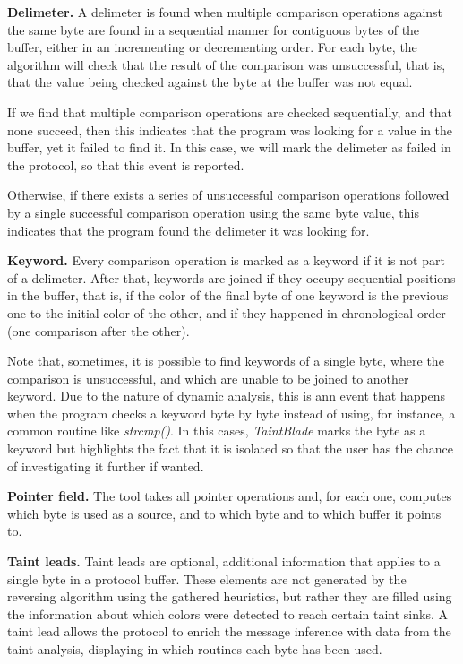 \documentclass[conference]{IEEEtran}
\begin{document}
\textbf{Delimeter.} A delimeter is found when multiple comparison operations against the same byte
are found in a sequential manner for contiguous bytes of the buffer, either in an incrementing
or decrementing order. For each byte, the algorithm will check that the result of the comparison
was unsuccessful, that is, that the value being checked against the byte at the buffer was not equal.

If we find that multiple comparison operations are checked sequentially, and
that none succeed, then this indicates that the program was looking for a value
in the buffer, yet it failed to find it. In this case, we will mark the
delimeter as failed in the protocol, so that this event is reported.

Otherwise, if there exists a series of unsuccessful comparison operations
followed by a single successful comparison operation using the same byte value,
this indicates that the program found the delimeter it was looking for.

\textbf{Keyword.} Every comparison operation is marked as a keyword if it is not part of a delimeter. After that,
keywords are joined if they occupy sequential positions in the buffer, that is, if the color of the final byte of
one keyword is the previous one to the initial color of the other, and if they happened in chronological order
(one comparison after the other).

Note that, sometimes, it is possible to find keywords of a single byte, where
the comparison is unsuccessful, and which are unable to be joined to another
keyword. Due to the nature of dynamic analysis, this is ann event that happens
when the program checks a keyword byte by byte instead of using, for instance,
a common routine like \textit{strcmp()}. In this cases, \textit{TaintBlade}
marks the byte as a keyword but highlights the fact that it is isolated so that
the user has the chance of investigating it further if wanted.

\textbf{Pointer field.} The tool takes all pointer operations and, for each one, computes which byte is used as a source,
and to which byte and to which buffer it points to.

\textbf{Taint leads.} Taint leads are optional, additional information that applies to a single byte in a protocol buffer.
These elements are not generated by the reversing algorithm using the gathered heuristics, but rather
they are filled using the information about which colors were detected to reach certain taint sinks.
A taint lead allows the protocol to enrich the message inference with data from the taint analysis,
displaying in which routines each byte has been used.
\end{document}
